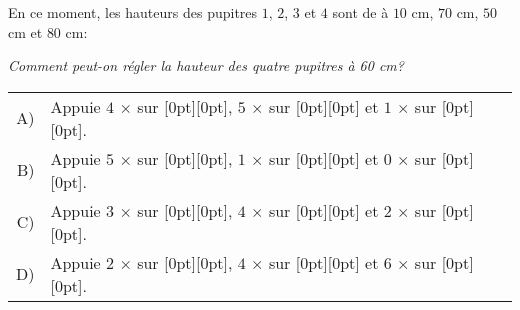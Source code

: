 {En ce moment, les hauteurs des pupitres $1$, $2$, $3$ et $4$ sont de à $10$ cm, $70$ cm, $50$ cm et $80$ cm:

{\centering%
\par}



{\em
Comment peut-on régler la hauteur des quatre pupitres à 60 cm?


}

\begin{tabularx}{\columnwidth}{ @{} r L @{} }
  A) & Appuie $4$ \ensuremath{\times} sur \raisebox{-0.5ex}[0pt][0pt]{}, $5$ \ensuremath{\times} sur \raisebox{-0.5ex}[0pt][0pt]{} et $1$ \ensuremath{\times} sur \raisebox{-0.5ex}[0pt][0pt]{}. \\ 
  B) & Appuie $5$ \ensuremath{\times} sur \raisebox{-0.5ex}[0pt][0pt]{}, $1$ \ensuremath{\times} sur \raisebox{-0.5ex}[0pt][0pt]{} et $0$ \ensuremath{\times} sur \raisebox{-0.5ex}[0pt][0pt]{}. \\ 
  C) & Appuie $3$ \ensuremath{\times} sur \raisebox{-0.5ex}[0pt][0pt]{}, $4$ \ensuremath{\times} sur \raisebox{-0.5ex}[0pt][0pt]{} et $2$ \ensuremath{\times} sur \raisebox{-0.5ex}[0pt][0pt]{}. \\ 
  D) & Appuie $2$ \ensuremath{\times} sur \raisebox{-0.5ex}[0pt][0pt]{}, $4$ \ensuremath{\times} sur \raisebox{-0.5ex}[0pt][0pt]{} et $6$ \ensuremath{\times} sur \raisebox{-0.5ex}[0pt][0pt]{}.
\end{tabularx}



}
